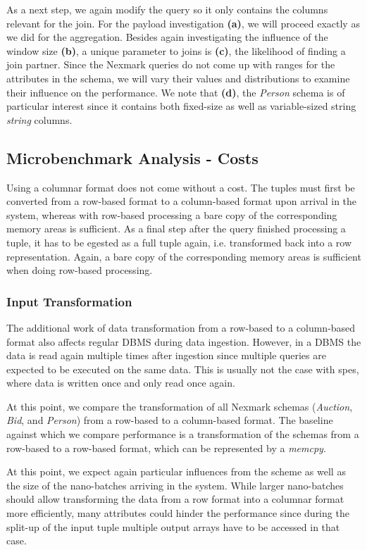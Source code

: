 As a next step, we again modify the query so it only contains the columns relevant for the join.
For the payload investigation \textbf{(a)}, we will proceed exactly as we did for the aggregation.
Besides again investigating the influence of the window size \textbf{(b)}, a unique parameter to joins is \textbf{(c)}, the likelihood of finding a join partner.
Since the Nexmark queries do not come up with ranges for the attributes in the schema, we will vary their values and distributions to examine their influence on the performance.
We note that \textbf{(d)}, the \emph{Person} schema is of particular interest since it contains both fixed-size as well as variable-sized string \emph{string} columns.

\subsection{Microbenchmark Analysis - Costs}

Using a columnar format does not come without a cost.
The tuples must first be converted from a row-based format to a column-based format upon arrival in the system, whereas with row-based processing a bare copy of the corresponding memory areas is sufficient.
As a final step after the query finished processing a tuple, it has to be egested as a full tuple again, i.e. transformed back into a row representation.
Again, a bare copy of the corresponding memory areas is sufficient when doing row-based processing.

\subsubsection{Input Transformation}
The additional work of data transformation from a row-based to a column-based format also affects regular DBMS during data ingestion.
However, in a DBMS the data is read again multiple times after ingestion since multiple queries are expected to be executed on the same data.
This is usually not the case with \acp{spe}, where data is written once and only read once again.

At this point, we compare the transformation of all Nexmark schemas (\emph{Auction}, \emph{Bid}, and \emph{Person}) from a row-based to a column-based format.
The baseline against which we compare performance is a transformation of the schemas from a row-based to a row-based format, which can be represented by a \emph{memcpy}.


At this point, we expect again particular influences from the scheme as well as the size of the nano-batches arriving in the system.
While larger nano-batches should allow transforming the data from a row format into a columnar format more efficiently, many attributes could hinder the performance since during the split-up of the input tuple multiple output arrays have to be accessed in that case.

